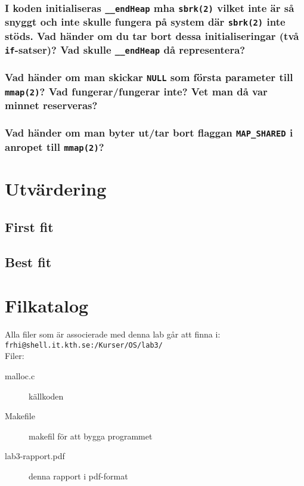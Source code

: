 \documentclass[a4paper]{article}
\begin{document}
\subsubsection*{I koden initialiseras \texttt{\_\_endHeap} mha \texttt{sbrk(2)} vilket inte är så snyggt och inte skulle fungera på system där \texttt{sbrk(2)} inte stöds. Vad händer om du tar bort dessa initialiseringar (två \texttt{if}-satser)? Vad skulle \texttt{\_\_endHeap} då representera?}


\subsubsection*{Vad händer om man skickar \texttt{NULL} som första parameter till \texttt{mmap(2)}? Vad fungerar/fungerar inte? Vet man då var minnet reserveras?}

\subsubsection*{Vad händer om man byter ut/tar bort flaggan \texttt{MAP\_SHARED} i anropet till \texttt{mmap(2)}?}

\section*{Utvärdering}


\subsection*{First fit}

\subsection*{Best fit}

\section*{Filkatalog}
Alla filer som är associerade med denna lab går att finna i:\\
\texttt{frhi@shell.it.kth.se:/Kurser/OS/lab3/}
\\
Filer:
\begin{description}
\item[malloc.c] källkoden
\item[Makefile] makefil för att bygga programmet
\item[lab3-rapport.pdf] denna rapport i pdf-format
\end{description}
\end{document}
